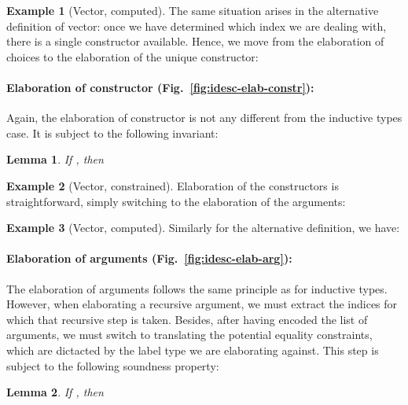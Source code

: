 \documentclass{scrartcl}
\theoremstyle{plain}
\newtheorem{lemma}{Lemma}
\theoremstyle{definition}
\newtheorem{example}{Example}
\begin{document}
\begin{example}[Vector, computed]

The same situation arises in the alternative definition of vector:
once we have determined which index we are dealing with, there is a
single constructor available. Hence, we move from the elaboration of
choices to the elaboration of the unique constructor:


\end{example}




\paragraph{Elaboration of constructor (Fig.~\ref{fig:idesc-elab-constr}):}
Again, the elaboration of constructor is not any different from the
inductive types case. It is subject to the following invariant:
\begin{lemma}\label{lemma:idesc-elab-constr}
If
, then

\end{lemma}



\begin{example}[Vector, constrained]

Elaboration of the constructors is straightforward, simply switching
to the elaboration of the arguments:


\end{example}



\begin{example}[Vector, computed]

Similarly for the alternative definition, we have:


\end{example}




\paragraph{Elaboration of arguments (Fig.~\ref{fig:idesc-elab-arg}):}
The elaboration of arguments follows the same principle as for
inductive types. However, when elaborating a recursive argument, we
must extract the indices for which that recursive step is
taken. Besides, after having encoded the list of arguments, we must
switch to translating the potential equality constraints, which are
dictacted by the label type we are elaborating against. This step is
subject to the following soundness property:
\begin{lemma}\label{lemma:idesc-elab-arg}
If 
, then

\end{lemma}
\end{document}
